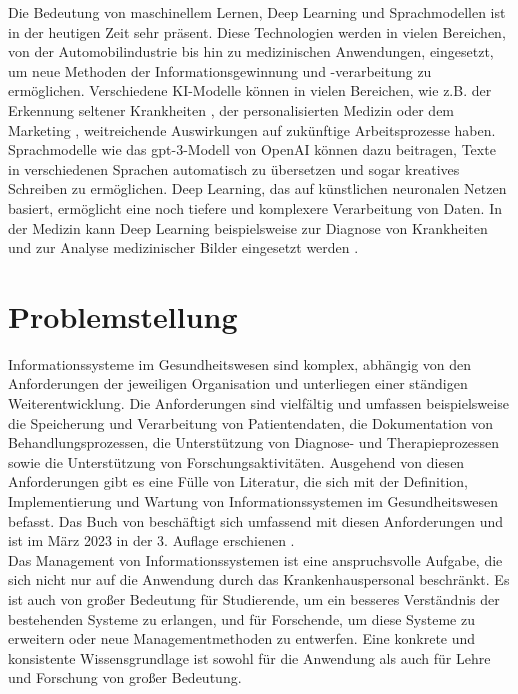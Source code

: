 Die Bedeutung von maschinellem Lernen, Deep Learning und Sprachmodellen ist in der heutigen Zeit sehr präsent.
Diese Technologien werden in vielen Bereichen, von der Automobilindustrie bis hin zu medizinischen Anwendungen, eingesetzt, um neue Methoden der Informationsgewinnung und -verarbeitung zu ermöglichen.
Verschiedene KI-Modelle können in vielen Bereichen, wie z.B. der Erkennung seltener Krankheiten \citep{rare_diseases}, der personalisierten Medizin \citep{precision_med} oder dem Marketing \citep{ai_marketing}, weitreichende Auswirkungen auf zukünftige Arbeitsprozesse haben.
Sprachmodelle wie das \ac{gpt}-3-Modell von OpenAI \citep{gpt3} können dazu beitragen, Texte in verschiedenen Sprachen automatisch zu übersetzen und sogar kreatives Schreiben zu ermöglichen.
Deep Learning, das auf künstlichen neuronalen Netzen basiert, ermöglicht eine noch tiefere und komplexere Verarbeitung von Daten.
In der Medizin kann Deep Learning beispielsweise zur Diagnose von Krankheiten und zur Analyse medizinischer Bilder eingesetzt werden \citep{skincancer}.

\section{Problemstellung}\label{sec:problemstellung}
Informationssysteme im Gesundheitswesen sind komplex, abhängig von den Anforderungen der jeweiligen Organisation und unterliegen einer ständigen Weiterentwicklung.
Die Anforderungen sind vielfältig und umfassen beispielsweise die Speicherung und Verarbeitung von Patientendaten, die Dokumentation von Behandlungsprozessen, die Unterstützung von Diagnose- und Therapieprozessen sowie die Unterstützung von Forschungsaktivitäten.
Ausgehend von diesen Anforderungen gibt es eine Fülle von Literatur, die sich mit der Definition, Implementierung und Wartung von Informationssystemen im Gesundheitswesen befasst.
Das Buch  von \citeauthor{bb} beschäftigt sich umfassend mit diesen Anforderungen und ist im März 2023 in der 3. Auflage erschienen \citep{bb}.\\

Das Management von Informationssystemen ist eine anspruchsvolle Aufgabe, die sich nicht nur auf die Anwendung durch das Krankenhauspersonal beschränkt.
Es ist auch von großer Bedeutung für Studierende, um ein besseres Verständnis der bestehenden Systeme zu erlangen, und für Forschende, um diese Systeme zu erweitern oder neue Managementmethoden zu entwerfen.
Eine konkrete und konsistente Wissensgrundlage ist sowohl für die Anwendung als auch für Lehre und Forschung von großer Bedeutung.\\

